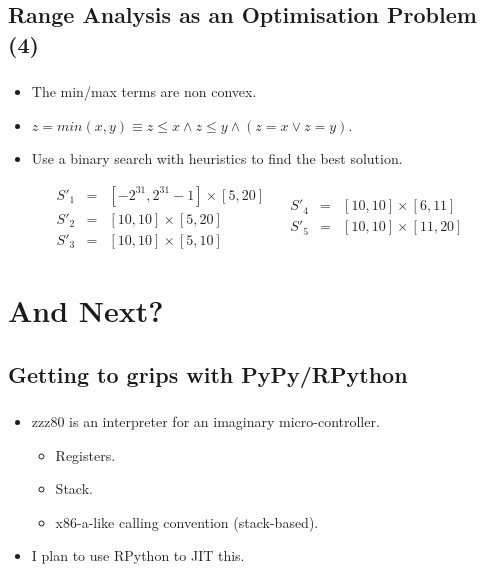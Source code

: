 \documentclass[compress]{beamer}
\begin{document}
\subsection{Range Analysis as an Optimisation Problem (4)}
\begin{frame}[fragile]
	\frametitle{\insertsubsection}

\begin{itemize}
\item The min/max terms are non convex.
\vfill
\item $z = min(x, y) \equiv z \leq x \wedge z \leq y \wedge (z = x \vee z = y)$.
\vfill
\item Use a binary search with heuristics to find the best solution.
\end{itemize}

\vfill

\[
\begin{array}{rcl}
S'_1 & = & [-2^{31}, 2^{31} - 1] \times [5, 20] \\
S'_2 & = & [10, 10] \times [5, 20] \\
S'_3 & = & [10, 10] \times [5, 10]
\end{array}
\quad
\begin{array}{rcl}
S'_4 & = & [10, 10] \times [6, 11] \\
S'_5 & = & [10, 10] \times [11, 20]
\end{array}
\]

\end{frame}

\section{And Next?}

\begin{frame}
  \sectionpage
\end{frame}


\subsection{Getting to grips with PyPy/RPython}
\begin{frame}[fragile]
	\frametitle{\insertsubsection}

	\begin{itemize}
	\item zzz80 is an interpreter for an imaginary micro-controller.
		\begin{itemize}
			\item Registers.
			\item Stack.
			\item x86-a-like calling convention (stack-based).
		\end{itemize}
		\vfill
	\item I plan to use RPython to JIT this.
	\end{itemize}
\end{frame}
\end{document}
